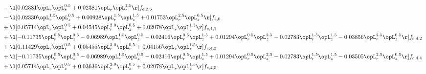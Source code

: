 \begin{alignat}{2}
& - \l[  0.02381 \opL_r \opL_z^{0.5} +  0.02381 \opL_r \opL_z^{1.5}  \r] f_{c,2,5} \nonumber \\ 
& - \l[  0.02330 \opL_r^{1.5} \opL_z^{0.5} +  0.00928 \opL_r^{1.5} \opL_z^{1.5} +  0.01753 \opL_r^{2.5} \opL_z^{0.5}  \r] f_{4,0} \nonumber \\ 
& + \l[  0.05714 \opL_r \opL_z^{0.5} +  0.04545 \opL_r^{2.0} \opL_z^{0.5} +  0.02078 \opL_r \opL_z^{1.5}  \r] f_{c,4,1} \nonumber \\ 
& + \l[  -0.11735 \opL_r^{0.5} \opL_z^{0.5}   -0.06989 \opL_r^{1.5} \opL_z^{0.5}   -0.02416 \opL_r^{0.5} \opL_z^{1.5} +  0.01294 \opL_r^{0.5} \opL_z^{2.5}   -0.02783 \opL_r^{1.5} \opL_z^{1.5}   -0.03856 \opL_r^{2.5} \opL_z^{0.5}  \r] f_{c,4,2} \nonumber \\ 
& + \l[  0.11429 \opL_r \opL_z^{0.5} +  0.05455 \opL_r^{2.0} \opL_z^{0.5} +  0.04156 \opL_r \opL_z^{1.5}  \r] f_{c,4,3} \nonumber \\ 
& + \l[  -0.11735 \opL_r^{0.5} \opL_z^{0.5}   -0.06989 \opL_r^{1.5} \opL_z^{0.5}   -0.02416 \opL_r^{0.5} \opL_z^{1.5} +  0.01294 \opL_r^{0.5} \opL_z^{2.5}   -0.02783 \opL_r^{1.5} \opL_z^{1.5}   -0.03505 \opL_r^{2.5} \opL_z^{0.5}  \r] f_{c,4,4} \nonumber \\ 
& + \l[  0.05714 \opL_r \opL_z^{0.5} +  0.03636 \opL_r^{2.0} \opL_z^{0.5} +  0.02078 \opL_r \opL_z^{1.5}  \r] f_{c,4,5} \nonumber \\ 
\end{alignat} 


